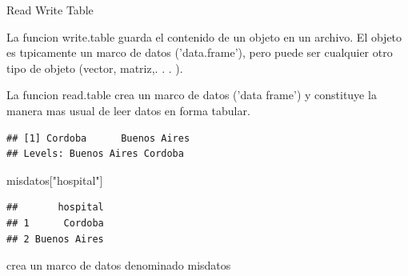 \documentclass[ignorenonframetext,]{beamer}
\newenvironment{Shaded}{\begin{snugshade}}{\end{snugshade}}
\newcommand{\KeywordTok}[1]{\textcolor[rgb]{0.13,0.29,0.53}{\textbf{#1}}}
\newcommand{\StringTok}[1]{\textcolor[rgb]{0.31,0.60,0.02}{#1}}
\newcommand{\OperatorTok}[1]{\textcolor[rgb]{0.81,0.36,0.00}{\textbf{#1}}}
\newcommand{\NormalTok}[1]{#1}
\begin{document}
\begin{frame}[fragile]{Read Write Table}

La funcion write.table guarda el contenido de un objeto en un archivo.
El objeto es tıpicamente un marco de datos ('data.frame'), pero puede
ser cualquier otro tipo de objeto (vector, matriz,. . . ).

La funcion read.table crea un marco de datos ('data frame') y constituye
la manera mas usual de leer datos en forma tabular.

\begin{Shaded}
\end{Shaded}

\begin{verbatim}
## [1] Cordoba      Buenos Aires
## Levels: Buenos Aires Cordoba
\end{verbatim}

\begin{Shaded}
\begin{Highlighting}[]
\NormalTok{misdatos[}\StringTok{"hospital"}\NormalTok{]}
\end{Highlighting}
\end{Shaded}

\begin{verbatim}
##       hospital
## 1      Cordoba
## 2 Buenos Aires
\end{verbatim}

crea un marco de datos denominado misdatos

\end{frame}
\end{document}
